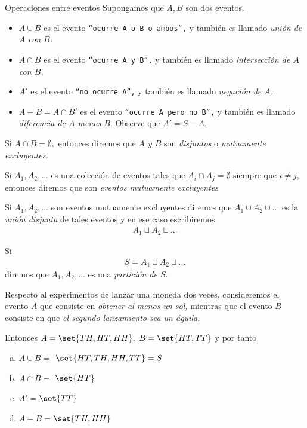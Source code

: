 {Operaciones entre eventos} Supongamos que $A,B$ son dos eventos. 
\begin{itemize}
 \item $A\cup B$ es el evento \texttt{``ocurre $A$ o $B$ o ambos'',} y también es llamado \emph{unión de $A$ con $B$.}  
 \item $A\cap B$ es el evento \texttt{``ocurre $A$ y $B$'',} y también es llamado \emph{intersección de $A$ con $B$.}  
 \item $A'$ es el evento \texttt{``no ocurre $A$'',} y también es llamado \emph{negación de $A$.} 
 \item $A-B=A\cap B'$ es el evento \texttt{``ocurre $A$ pero no $B$'',} y también es llamado \emph{diferencia de $A$ menos $B.$}  Observe que
 $A' = S - A.$
\end{itemize}

{}
 Si $A\cap B= \emptyset,$ entonces diremos que \emph{$A$ y $B$} son \emph{disjuntos} o \emph{mutuamente excluyentes.} 

 \begin{defn}
  Si $A_{1},A_{2},...$ es una colección de eventos tales que $A_{i}\cap A_{j}=\emptyset$ siempre que $i\neq j,$ entonces diremos que son \emph{eventos mutuamente excluyentes}
 \end{defn}

 


 \begin{defn}
  Si $A_{1}, A_{2}, ...$ son eventos mutuamente excluyentes diremos que $A_{1} \cup A_{2} \cup ... $ es la \emph{unión disjunta} de tales eventos y en ese caso escribiremos
  \begin{align*}
A_{1}\sqcup A_{2} \sqcup ...
\end{align*}
 \end{defn}


Si \begin{align*}
S=A_{1}\sqcup A_{2} \sqcup ...
\end{align*}
diremos que $A_{1},A_{2},...$ es una \emph{partición de $S.$}


 \begin{ejemplo}
  \label{exmp:1.9}
  Respecto al experimentos de lanzar una moneda dos veces, consideremos el evento $A$ que consiste en \emph{obtener al menos un sol,}  mientras que el evento $B$ consiste en que \emph{el segundo lanzamiento sea un águila.}

  Entonces $A=\set{TH,HT,HH},$ $B=\set{HT,TT}$ y por tanto 
  \begin{enumerate}[(a)]
   \item $A\cup B =$ $\set{HT,TH,HH,TT}= S$ 
	\item $A\cap B =$ $\set{HT}$ 
	\item $A'=$$\set{TT}$
	\item $A-B=$$\set{TH,HH}$
  \end{enumerate}

 \end{ejemplo}


